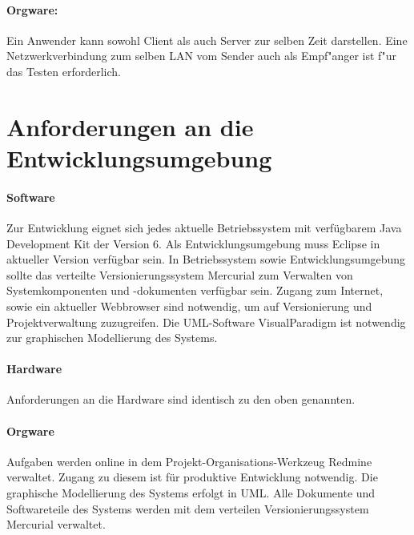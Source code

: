 \paragraph{Orgware:} Ein Anwender kann sowohl Client als auch Server zur selben Zeit darstellen. Eine Netzwerkverbindung zum selben LAN vom Sender auch als Empf"anger ist f"ur das Testen erforderlich.

\section{Anforderungen an die Entwicklungsumgebung}
\label{sec:anf}

\paragraph{Software} Zur Entwicklung eignet sich jedes aktuelle Betriebssystem
mit verfügbarem Java Development Kit der Version 6. Als Entwicklungsumgebung
muss Eclipse in aktueller Version verfügbar sein. In Betriebssystem sowie
Entwicklungsumgebung sollte das verteilte Versionierungssystem Mercurial zum
Verwalten von Systemkomponenten und -dokumenten verfügbar sein. Zugang zum
Internet, sowie ein aktueller Webbrowser sind notwendig, um auf Versionierung
und Projektverwaltung zuzugreifen. Die UML-Software VisualParadigm ist notwendig zur graphischen
Modellierung des Systems.

\paragraph{Hardware} Anforderungen an die Hardware sind identisch zu den
oben genannten.

\paragraph{Orgware} Aufgaben werden online in dem Projekt-Organisations-Werkzeug
Redmine verwaltet. Zugang zu diesem ist für produktive Entwicklung notwendig.
Die graphische Modellierung des Systems erfolgt in UML. Alle Dokumente und
Softwareteile des Systems werden mit dem verteilen Versionierungssystem
Mercurial verwaltet.
